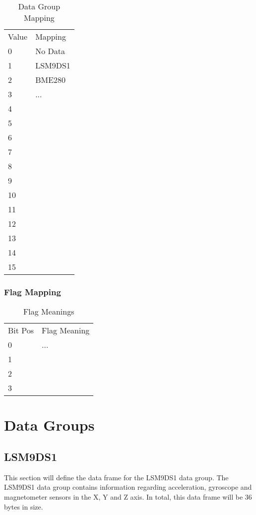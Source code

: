 \documentclass{article}
\begin{document}
  \begin{table}[h]
  \centering
  \caption{Data Group Mapping}
  \begin{tabular}{ll}
  Value & Mapping \\
  0     & No Data \\
  1     & LSM9DS1     \\
  2     & BME280        \\
  3     & ...        \\
  4     &         \\
  5     &         \\
  6     &         \\
  7     &         \\
  8     &         \\
  9     &         \\
  10    &         \\
  11    &         \\
  12    &         \\
  13    &         \\
  14    &         \\
  15    &        
  \end{tabular}
  \end{table}

  \subsubsection{Flag Mapping}
  
  \begin{table}[H]
  \centering
  \caption{Flag Meanings}
  \begin{tabular}{ll}
  Bit Pos & Flag Meaning \\
  0       & ...          \\
  1       &              \\
  2       &              \\
  3       &             
  \end{tabular}
  \end{table}
  
  \section{Data Groups}
  \subsection{LSM9DS1}
  This section will define the data frame for the LSM9DS1 data group. The LSM9DS1 data group contains information regarding acceleration, gyroscope and magnetometer sensors in the X, Y and Z axis. In total, this data frame will be 36 bytes in size. 
\end{document}
